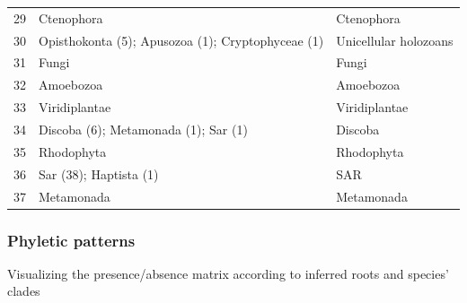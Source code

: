 \begin{table}[H]
\begin{tabular}[t]{rll}
\rowcolor{gray!6}  29 & Ctenophora & Ctenophora\\
30 & Opisthokonta (5); Apusozoa (1); Cryptophyceae (1) & Unicellular holozoans\\
\rowcolor{gray!6}  31 & Fungi & Fungi\\
32 & Amoebozoa & Amoebozoa\\
\rowcolor{gray!6}  33 & Viridiplantae & Viridiplantae\\
34 & Discoba (6); Metamonada (1); Sar (1) & Discoba\\
\rowcolor{gray!6}  35 & Rhodophyta & Rhodophyta\\
36 & Sar (38); Haptista (1) & SAR\\
\rowcolor{gray!6}  37 & Metamonada & Metamonada\\
\bottomrule
\end{tabular}
\end{table}

\hypertarget{phyletic-patterns}{%
\subsubsection{Phyletic patterns}\label{phyletic-patterns}}

Visualizing the presence/absence matrix according to inferred roots and
species' clades


